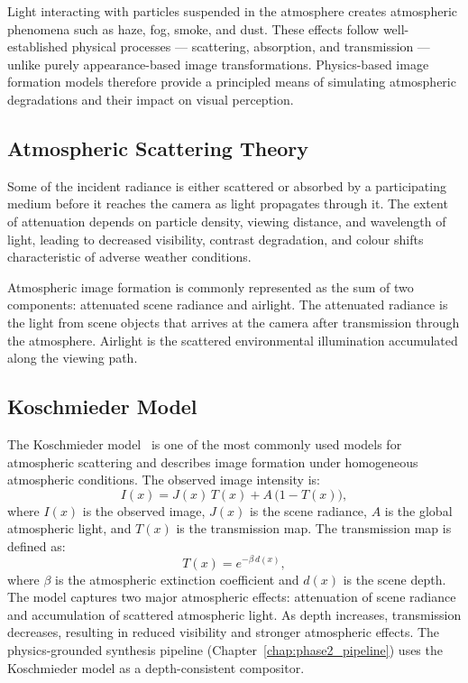 Light interacting with particles suspended in the atmosphere creates atmospheric phenomena such as haze, fog, smoke, and dust.
These effects follow well-established physical processes --- scattering, absorption, and transmission --- unlike purely appearance-based image transformations.
Physics-based image formation models therefore provide a principled means of simulating atmospheric degradations and their impact on visual perception.

\subsection{Atmospheric Scattering Theory}

Some of the incident radiance is either scattered or absorbed by a participating medium before it reaches the camera as light propagates through it.
The extent of attenuation depends on particle density, viewing distance, and wavelength of light, leading to decreased visibility, contrast degradation, and colour shifts characteristic of adverse weather conditions.

\noindent Atmospheric image formation is commonly represented as the sum of two components: attenuated scene radiance and airlight.
The attenuated radiance is the light from scene objects that arrives at the camera after transmission through the atmosphere.
Airlight is the scattered environmental illumination accumulated along the viewing path.

\subsection{Koschmieder Model}

The Koschmieder model~\cite{koschmieder1924theorie} is one of the most commonly used models for atmospheric scattering and describes image formation under homogeneous atmospheric conditions.
The observed image intensity is:
\begin{equation}
    I(x) = J(x)\,T(x) + A\,\bigl(1-T(x)\bigr),
\end{equation}
where $I(x)$ is the observed image, $J(x)$ is the scene radiance, $A$ is the global atmospheric light, and $T(x)$ is the transmission map.
The transmission map is defined as:
\begin{equation}
    T(x) = e^{-\beta\, d(x)},
\end{equation}
where $\beta$ is the atmospheric extinction coefficient and $d(x)$ is the scene depth.
The model captures two major atmospheric effects: attenuation of scene radiance and accumulation of scattered atmospheric light.
As depth increases, transmission decreases, resulting in reduced visibility and stronger atmospheric effects.
The physics-grounded synthesis pipeline (Chapter~\ref{chap:phase2_pipeline}) uses the Koschmieder model as a depth-consistent compositor.

